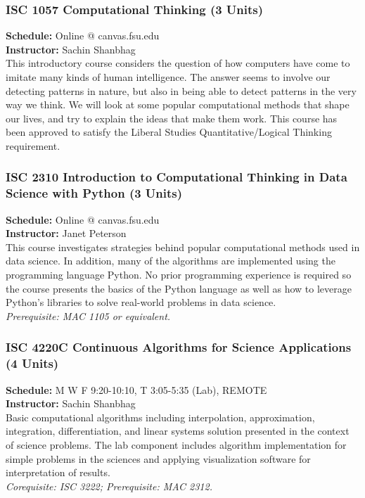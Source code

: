 \documentclass[12pt,a4paper]{article}
\begin{document}
\subsubsection*{ISC 1057 Computational Thinking (3 Units)}
\textbf{Schedule:} Online @ canvas.fsu.edu \\
\textbf{Instructor:} Sachin Shanbhag \\
This introductory course considers the question of how computers have come to imitate many kinds of human intelligence. The answer seems to involve our detecting patterns in nature, but also in being able to detect patterns in the very way we think. We will look at some popular computational methods that shape our lives, and try to explain the ideas that make them work. This course has been approved to satisfy the Liberal Studies Quantitative/Logical Thinking requirement.

\subsubsection*{ISC 2310 Introduction to Computational Thinking in Data Science with Python (3 Units)}
\textbf{Schedule:} Online @ canvas.fsu.edu \\
\textbf{Instructor:} Janet Peterson \\
This course investigates strategies behind popular computational methods used in data science. In addition, many of the algorithms are implemented using the programming language Python. No prior programming experience is required so the course presents the basics of the Python language as well as how to leverage Python’s libraries to solve real-world problems in data science. \\
\textit{Prerequisite: MAC 1105 or equivalent.}

\subsubsection*{ISC 4220C Continuous Algorithms for Science Applications (4 Units)}
\textbf{Schedule:} M W F 9:20-10:10, T 3:05-5:35 (Lab), REMOTE \\
\textbf{Instructor:} Sachin Shanbhag \\
Basic computational algorithms including interpolation, approximation, integration, differentiation, and linear systems solution presented in the context of science problems. The lab component includes algorithm implementation for simple problems in the sciences and applying visualization software for interpretation of results. \\
\textit{Corequisite: ISC 3222; Prerequisite: MAC 2312.}
\end{document}
